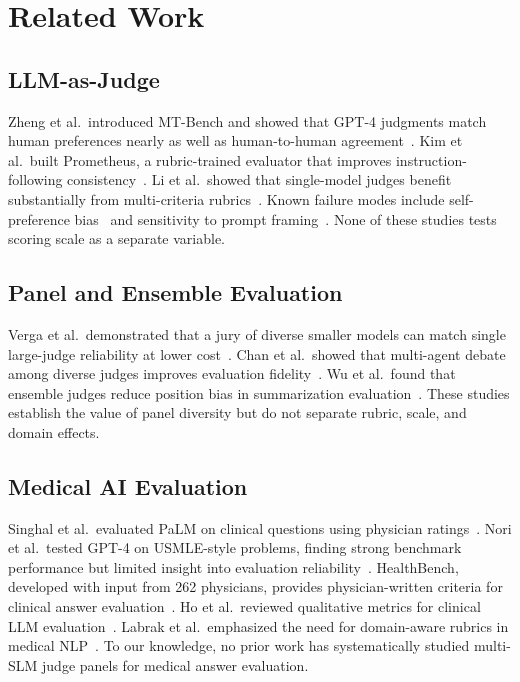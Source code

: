 \documentclass[conference]{IEEEtran}
\begin{document}
\section{Related Work}

\subsection{LLM-as-Judge}
Zheng et al.\ introduced MT-Bench and showed that GPT-4 judgments match
human preferences nearly as well as human-to-human agreement~\cite{zheng2023judging}.
Kim et al.\ built Prometheus, a rubric-trained evaluator that improves
instruction-following consistency~\cite{kim2024prometheus}. Li et al.\
showed that single-model judges benefit substantially from multi-criteria
rubrics~\cite{li2023generative}. Known failure modes include
self-preference bias~\cite{panickssery2024bias} and sensitivity to
prompt framing~\cite{zeng2023framing}. None of these studies tests
scoring scale as a separate variable.

\subsection{Panel and Ensemble Evaluation}
Verga et al.\ demonstrated that a jury of diverse smaller models can
match single large-judge reliability at lower cost~\cite{verga2024replacing}.
Chan et al.\ showed that multi-agent debate among diverse judges
improves evaluation fidelity~\cite{chan2023chateval}. Wu et al.\ found
that ensemble judges reduce position bias in summarization
evaluation~\cite{wu2023ensemble}. These studies establish the value of
panel diversity but do not separate rubric, scale, and domain effects.

\subsection{Medical AI Evaluation}
Singhal et al.\ evaluated PaLM on clinical questions using physician
ratings~\cite{singhal2023large}. Nori et al.\ tested GPT-4 on USMLE-style
problems, finding strong benchmark performance but limited insight into
evaluation reliability~\cite{nori2023gpt4}. HealthBench, developed with
input from 262 physicians, provides physician-written criteria for
clinical answer evaluation~\cite{arora2025healthbench}. Ho et al.\
reviewed qualitative metrics for clinical LLM evaluation~\cite{ho2024qualitative}.
Labrak et al.\ emphasized the need for domain-aware rubrics in medical
NLP~\cite{labrak2024biomistral}. To our knowledge, no prior work has
systematically studied multi-SLM judge panels for medical answer evaluation.
\end{document}
